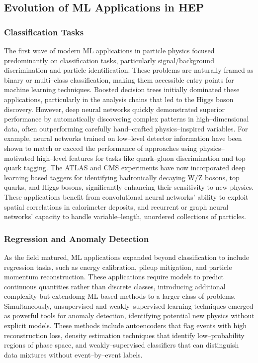 \subsection{Evolution of ML Applications in HEP}
\subsubsection{Classification Tasks}
The first wave of modern ML applications in particle physics focused predominantly on classification tasks, particularly signal/background discrimination and particle identification.
%
These problems are naturally framed as binary or multi--class classification, making them accessible entry points for machine learning techniques.
%
Boosted decision trees initially dominated these applications, particularly in the analysis chains that led to the Higgs boson discovery.
%
However, deep neural networks quickly demonstrated superior performance by automatically discovering complex patterns in high--dimensional data, often outperforming carefully hand--crafted physics--inspired variables.
%
For example, neural networks trained on low--level detector information have been shown to match or exceed the performance of approaches using physics--motivated high--level features for tasks like quark--gluon discrimination and top quark tagging.
%
The ATLAS and CMS experiments have now incorporated deep learning based taggers for identifying hadronically decaying W/Z bosons, top quarks, and Higgs bosons, significantly enhancing their sensitivity to new physics.
%
These applications benefit from convolutional neural networks' ability to exploit spatial correlations in calorimeter deposits, and recurrent or graph neural networks' capacity to handle variable--length, unordered collections of particles.

\subsubsection{Regression and Anomaly Detection}
As the field matured, ML applications expanded beyond classification to include regression tasks, such as energy calibration, pileup mitigation, and particle momentum reconstruction.
%
These applications require models to predict continuous quantities rather than discrete classes, introducing additional complexity but extendomg ML based methods to a larger class of problems.
%
Simultaneously, unsupervised and weakly--supervised learning techniques emerged as powerful tools for anomaly detection, identifying potential new physics without explicit models.
%
These methods include autoencoders that flag events with high reconstruction loss, density estimation techniques that identify low--probability regions of phase space, and weakly--supervised classifiers that can distinguish data mixtures without event--by--event labels.

